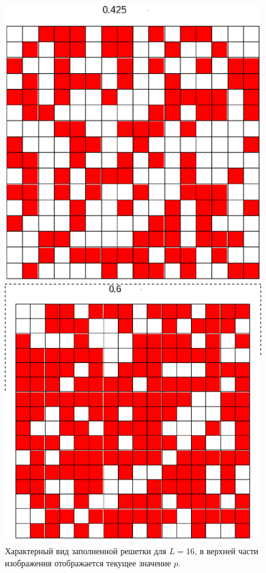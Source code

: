 \documentclass[14pt,a4paper,report]{ncc}
\begin{document}
\begin{figure}[h!]
\begin{center}
\begin{minipage}[h!]{0.45\linewidth}
\includegraphics[width=1\linewidth]{L16_1}
\caption{Характерный вид заполненной решетки для $L=16$, в верхней части изображения отображается текущее значение $p$.} %
\label{ris:experimoriginal} %
\end{minipage}
\hfill
\begin{minipage}[h!]{0.45\linewidth}
\includegraphics[width=1\linewidth]{L16_2}

\end{minipage}
\end{center}
\end{figure}
\end{document}
